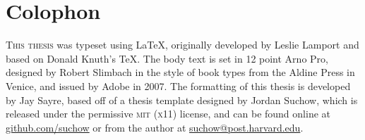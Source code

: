 \chapter*{Colophon}

\begin{center}
\parbox{200pt}{\raggedright\lettrine[lines=3,slope=-2pt,nindent=-4pt]{
\textcolor{Customcolor}{T}}{his thesis} was typeset using \LaTeX, 
originally developed by Leslie Lamport and based on Donald Knuth's \TeX. The body 
text is set in 12 point Arno Pro, designed by Robert Slimbach in the 
style of book types from the Aldine Press in Venice, and issued by Adobe in 2007. 
The formatting of this thesis is developed by Jay Sayre, 
based off of a thesis template designed by Jordan Suchow, 
which is released under the permissive \textsc{mit} (\textsc{x}11) license, 
and can be found online at \href{https://github.com/suchow/}{github.com/suchow} or 
from the author at \href{mailto:suchow@fas.harvard.edu}{suchow@post.harvard.edu}.
}
\end{center}
